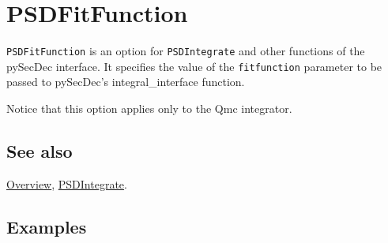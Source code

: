 \documentclass[../FeynHelpersManual.tex]{subfiles}
\begin{document}
\hypertarget{psdfitfunction}{
\section{PSDFitFunction}\label{psdfitfunction}}

\texttt{PSDFitFunction} is an option for \texttt{PSDIntegrate} and other
functions of the pySecDec interface. It specifies the value of the
\texttt{fitfunction} parameter to be passed to pySecDec's
integral\_interface function.

Notice that this option applies only to the Qmc integrator.

\subsection{See also}

\hyperlink{toc}{Overview}, \hyperlink{psdintegrate}{PSDIntegrate}.

\subsection{Examples}
\end{document}
